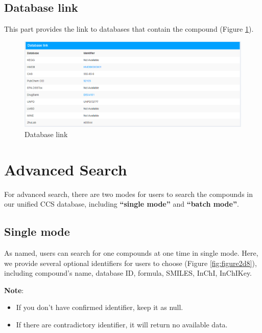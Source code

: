 \documentclass[12pt,]{book}
\providecommand{\tightlist}{%
  \setlength{\itemsep}{0pt}\setlength{\parskip}{0pt}}
\theoremstyle{definition}
\theoremstyle{definition}
\theoremstyle{definition}
\theoremstyle{remark}
\begin{document}
\subsection{Database link}\label{chapter2d2d5}

This part provides the link to databases that contain the compound
(Figure \ref{fig:figure2d7}).

\begin{figure}

{\centering \includegraphics{images/chapter2/figure2.7database_link} 

}

\caption{Database link}\label{fig:figure2d7}
\end{figure}

\section{Advanced Search}\label{chapter2d3}

For advanced search, there are two modes for users to search the
compounds in our unified CCS database, including \textbf{``single
mode''} and \textbf{``batch mode''}.

\subsection{Single mode}\label{chapter2d3d1}

As named, users can search for one compounds at one time in single mode.
Here, we provide several optional identifiers for users to choose
(Figure \ref{fig:figure2d8}), including compound's name, database ID,
formula, SMILES, InChI, InChIKey.

\textbf{Note}:

\begin{itemize}
\tightlist
\item
  If you don't have confirmed identifier, keep it as null.
\item
  If there are contradictory identifier, it will return no available
  data.
\end{itemize}
\end{document}
